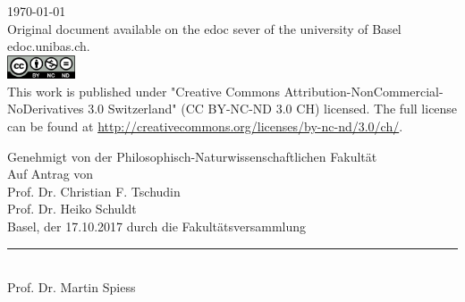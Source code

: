 \begin{titlepage}
\begin{center}
\vfill
{\large \today\\[1cm]}
{\footnotesize Original document available on the edoc sever of the university of Basel edoc.unibas.ch.\\[0.5cm]
\includegraphics[height=7mm]{./inc/cclic.png}~\\[0.5cm]
This work is published under  "Creative Commons Attribution-NonCommercial-NoDerivatives 3.0 Switzerland" (CC BY-NC-ND 3.0 CH) licensed. The full license can be found at \url{http://creativecommons.org/licenses/by-nc-nd/3.0/ch/}.
}
\end{center}
\end{titlepage}\restoregeometry\onecolumn\clearpage\pagestyle{plain}

\begin{center}

Genehmigt von der Philosophisch-Naturwissenschaftlichen Fakult\"at\\
Auf Antrag von\\[0.5cm]
Prof. Dr. Christian F. Tschudin\\Prof. Dr. Heiko Schuldt\\[0.5cm]

Basel, der 17.10.2017 durch die Fakult\"atsversammlung\\[2cm]
{\rule{6cm}{0.2pt}\\ Prof. Dr. Martin Spiess}
\end{center}
\vfill\twocolumn
\begin{abstract}        
		\myabstract
\end{abstract}






